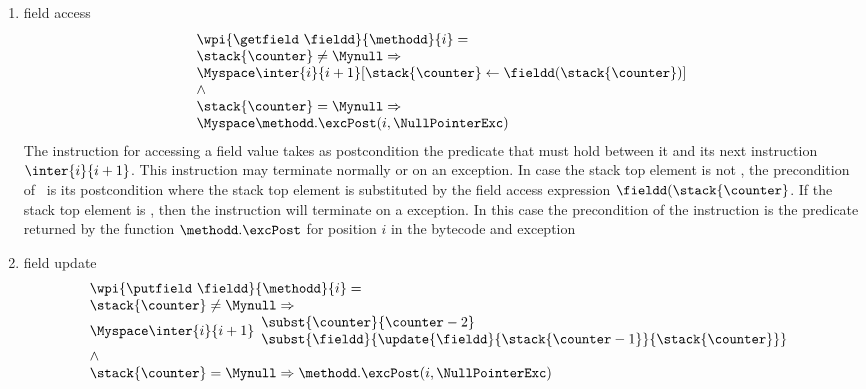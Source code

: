 \begin{itemize}
\begin{enumerate}
			\item field access  \\
				 $$ 	\begin{array}{l} \wpi{\getfield  \ \fieldd } {\methodd}{i}  =  \\
				 		\stack{\counter } \ne \Mynull \Rightarrow \\
						      \Myspace	\inter{i}{i+1}[ \stack{\counter } \leftarrow \fieldd ( \stack{\counter } ) ] \\
									 \wedge \\
						\stack{\counter } = \Mynull \Rightarrow \\
								\Myspace     \methodd.\excPost( i, \NullPointerExc) 
					\end{array} 
					$$
			  The instruction for accessing a field value takes as postcondition the predicate that must hold between it and its next instruction
			  $\inter{i}{i+1}$.  This instruction may terminate normally or on an exception.
			  In case the stack top element is not \Mynull, the precondition of \getfield \ is its postcondition where the stack 
			  top element is substituted by the field access expression $\fieldd ( \stack{\counter }$.
			  If the stack top element is \Mynull, then the instruction will terminate on  a \NullPointerExc exception. In this case the precondition
			  of the instruction is the predicate returned by the function $\methodd.\excPost$ for position $i$ in the bytecode and exception \NullPointerExc
			  
			\item  field update \\
			$$\begin{array}{l}
                                  \wpi{\putfield  \ \fieldd } {\methodd}{i}  =  \\
				 		\stack{\counter } \ne \Mynull \Rightarrow \\
						 \Myspace \inter{i}{i+1}
                                                     \begin{array}{l}
                                                              \subst{ \counter }{  \counter -2 } \\
							     \subst{  \fieldd}{ \update{\fieldd}{ \stack{\counter - 1}}{  \stack{\counter} } }
						       \end{array} 
						        \\
							\wedge \\
							\stack{\counter } = \Mynull \Rightarrow   \methodd.\excPost( i, \NullPointerExc ) \\
					  \end{array} 
					$$
			                

\end{enumerate}
\end{itemize}
